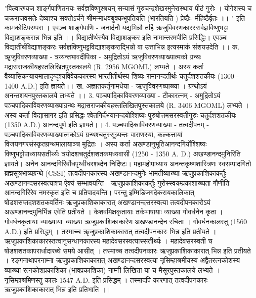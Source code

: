 "विल्वारण्यज शार्ङ्गपाणितनयः सर्वज्ञविष्णुश्श्रयन् 
सन्यासं गुरुचन्द्रशेखरमुनेरास्थाय पीठं गुरोः ।
योगेशस्य च चक्रराजवसतेः देव्याश्च सक्तोऽर्चने 
श्रीमन्माधवबुक्कभूपतियति (भारतियति ) प्रेष्ठैः- र्महिष्ठैर्वृतः ।। "
इति कामकोटिपरम्परा । एवञ्च शार्ङ्गपाणि - जनार्दनौ यद्यभिन्नौ तर्हि ऋजुविवरणकारस्सर्वज्ञविष्णुभट्टः विद्याशङ्करान्न भिन्न इति ।। 
विद्यातीर्थस्यैव विद्याशङ्कर इति नामान्तरमपीति प्रसिद्धिः। एवञ्च विद्यातीर्थविद्याशङ्करः सर्वज्ञविष्णुभट्टविद्याशङ्कराद्भिन्नो वा उत्ताभिन्न इत्यस्माकं संशयउदेति ।।
क. ऋृजुविवरणव्याख्या - त्रय्यन्तभावदीपिका -
अमुद्रितोऽयं ऋजुविवरणव्याख्यात्मको ग्रन्थः मद्रासराजकीयहस्तलिखितपुस्तकालये (R. 2956 MGOML) लभ्यते । अस्य कर्ता वैय्यासिकन्यायमालादृग्दृश्यविवेककारस्य भारतीतीर्थस्य शिष्यः रामानन्दतीर्थः चतुर्दशशतकीयः (1300 - 1400 A.D.) इति ज्ञायते।। 
ख. अज्ञातकर्तृनामधेया - ऋजुविवरणव्याख्या । ग्रन्थोऽयं अनन्तशयनपुस्तकालये लभ्यते ।। 
3. पञ्चपादिकाविवरणव्याख्या - टीकारत्नम् -
अमुद्रितोऽयं पञ्चपादिकाविवरणव्याख्याग्रन्थः मद्रासराजकीयहस्तलिखितपुस्तकालये (R. 3406 MGOML) लभ्यते । अस्य कर्ता विद्यासागर इति प्रसिद्धः श्वेतगिर्दभयानन्दयोश्शिष्यः पुरुषोत्तमसरस्वतीगुरुः चतुर्दशशतकीयः (1350 A.D.) आनन्दपूर्ण इति ज्ञायते।। 
4. पञ्चपादिकाविवरणव्याख्या - तत्वदीपनम् - 
पञ्चपादिकाविवरणव्याख्यात्मकोऽयं ग्रन्थश्चतुस्सूत्र्यन्तः वाराणस्यां, कल्कत्तायां विजयनगरसंस्कृतग्रन्थमालायाञ्च मुद्रितः । अस्य कर्ता अखण्डानुभूतिआनन्दगिर्योश्शिष्यः विष्णुभट्टोपाध्यायसतीर्थ्यः त्रयोदशचतुर्दशशतकमध्यवासी (1250 - 1350 A. D.) अखण्डानन्दमुनिरिति ज्ञायते। अनेन आनन्दगिरिर्बोधपृथ्वीधरशब्देन निर्दिष्टः। महामहोपाध्याय अनन्तकृष्णशास्त्रिणः स्वसम्पादगितो ब्रह्मसूत्रभाष्यग्रन्थे (CSSI) तत्वदीपनकारस्य अखण्डानन्दमुनेः भामतीव्याख्या ऋजुुप्रकाशिकाकर्तुः अखण्डानन्दसरस्वत्याश्च ऐक्यं सम्भावयन्ति। ऋजुप्रकाशिकाकर्तुः गुरोस्स्वयम्प्रकाशाख्यता गौणीति आनन्दगिरिरेव नमस्कृत इति च प्रतिपादयन्ति। 
परन्तु इम्मिडिजगदेकरायकालिकात् षोडशसप्तदशशतकवर्तिनः ऋजुप्रकाशिकाकारात् अखण्डानन्दसरस्वत्या तत्वदीपनकारोऽयं अखण्डानन्दमुनिर्भिन्न एवेति प्रतीयते । केशवमिक्षकृतायाः तर्कभाषायाः व्याख्या गोवर्धनेन कृता । गोवर्धनकृतायाः व्याख्यायाः व्याख्या ऋजुप्रकाशिकाकारेण अखण्डानन्देन रचिता । गोवर्धनकालस्तु (1560 A.D.) इति प्रसिद्धम् । तस्माच्च ऋृजुप्रकाशिकाकारात् तत्वदीपनकारः भिन्न इति प्रतीयते । ऋजुप्रकाशिकाकारस्तत्वानुसन्धानकारस्य महादेवसरस्वत्यास्सतीर्थ्यः । महादेवसरस्वती च षोडशशतकापरार्धादारब्घे समये आसीत् । तस्माच्च तत्वदीपनकारः ऋजुप्रकाशिकाकारात् भिन्न इति प्रतीयते । रङ्गनाथापरनाम्ना ऋजुप्रकाशिकाकारात् अखण्डानन्दसरस्वत्या नृसिम्हाश्रमीयस्य अद्वैतरत्नकोशस्य व्याख्या रत्नकोशप्रकाशिका (भावप्रकाशिका) नाम्नी लिखिता या च  मैसूरपुस्तकालये लभ्यते । नृसिम्हाश्रमिणस्तु कालः  1547 A.D. इति प्रसिद्धम् । तस्मादपि कारणात् तत्वदीपनकारः ऋजुप्रकाशिकाकारात् भिन्न इति प्रतिभाति ।। 
